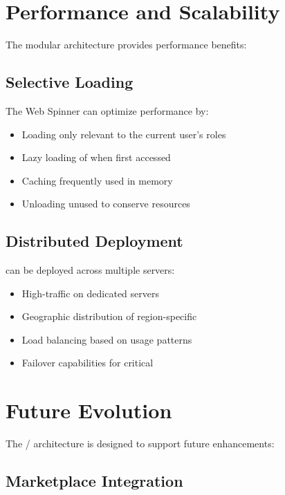 \section{Performance and Scalability}
\label{sec:performance-scalability}

The modular architecture provides performance benefits:

\subsection{Selective Loading}

The Web Spinner can optimize performance by:
\begin{itemize}
\item Loading only  relevant to the current user's roles
\item Lazy loading of  when first accessed
\item Caching frequently used  in memory
\item Unloading unused  to conserve resources
\end{itemize}

\subsection{Distributed Deployment}

 can be deployed across multiple servers:
\begin{itemize}
\item High-traffic  on dedicated servers
\item Geographic distribution of region-specific 
\item Load balancing based on \webbaselet{} usage patterns
\item Failover capabilities for critical 
\end{itemize}

\section{Future Evolution}
\label{sec:future-evolution}

The \webbase{}/\webbaselet{} architecture is designed to support future enhancements:

\subsection{Marketplace Integration}

